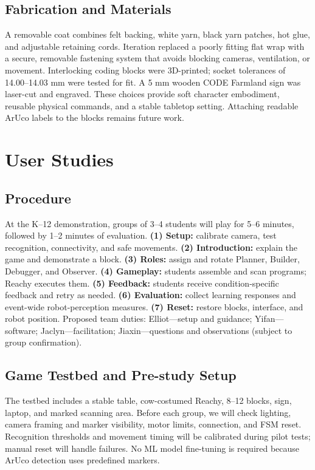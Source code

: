 \documentclass[conference,12pt,letterpaper]{IEEEtran}
\begin{document}
\subsection{Fabrication and Materials}

A removable coat combines felt backing, white yarn, black yarn patches, hot glue, and adjustable retaining cords. Iteration replaced a poorly fitting flat wrap with a secure, removable fastening system that avoids blocking cameras, ventilation, or movement. Interlocking coding blocks were 3D-printed; socket tolerances of 14.00--14.03 mm were tested for fit. A 5 mm wooden CODE Farmland sign was laser-cut and engraved. These choices provide soft character embodiment, reusable physical commands, and a stable tabletop setting. Attaching readable ArUco labels to the blocks remains future work.

\section{User Studies}

\subsection{Procedure}

At the K--12 demonstration, groups of 3--4 students will play for 5--6 minutes, followed by 1--2 minutes of evaluation. \textbf{(1) Setup:} calibrate camera, test recognition, connectivity, and safe movements. \textbf{(2) Introduction:} explain the game and demonstrate a block. \textbf{(3) Roles:} assign and rotate Planner, Builder, Debugger, and Observer. \textbf{(4) Gameplay:} students assemble and scan programs; Reachy executes them. \textbf{(5) Feedback:} students receive condition-specific feedback and retry as needed. \textbf{(6) Evaluation:} collect learning responses and event-wide robot-perception measures. \textbf{(7) Reset:} restore blocks, interface, and robot position. Proposed team duties: Elliot---setup and guidance; Yifan---software; Jaclyn---facilitation; Jiaxin---questions and observations (subject to group confirmation).

\subsection{Game Testbed and Pre-study Setup}

The testbed includes a stable table, cow-costumed Reachy, 8--12 blocks, sign, laptop, and marked scanning area. Before each group, we will check lighting, camera framing and marker visibility, motor limits, connection, and FSM reset. Recognition thresholds and movement timing will be calibrated during pilot tests; manual reset will handle failures. No ML model fine-tuning is required because ArUco detection uses predefined markers.
\end{document}
